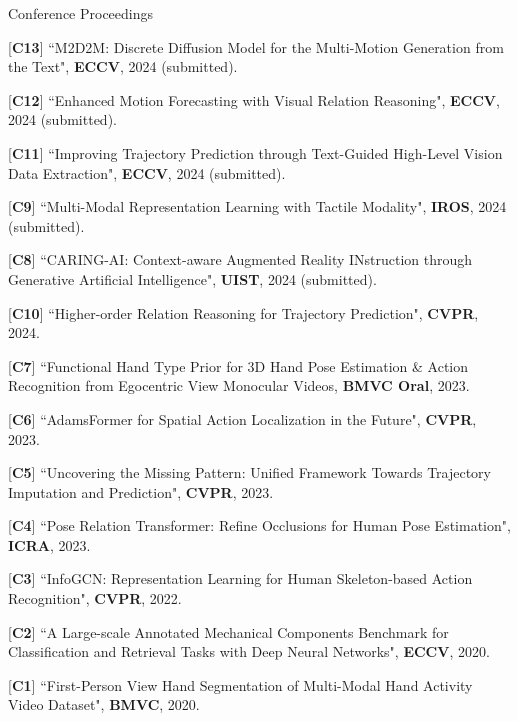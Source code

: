 


\begin{cventries}
\cvpub
{Conference Proceedings} %
{ %
\begin{cvitems}
    \item {[\textbf{C13}] ``M2D2M: Discrete Diffusion Model for the Multi-Motion Generation from the Text", \textbf{ECCV}, 2024 (submitted).}
    \item {[\textbf{C12}] ``Enhanced Motion Forecasting with Visual Relation Reasoning", \textbf{ECCV}, 2024 (submitted).}
    \item {[\textbf{C11}] ``Improving Trajectory Prediction through Text-Guided High-Level Vision Data Extraction", \textbf{ECCV}, 2024 (submitted).}
    \item {[\textbf{C9}] ``Multi-Modal Representation Learning with Tactile Modality", \textbf{IROS}, 2024 (submitted).}
    \item {[\textbf{C8}] ``CARING-AI: Context-aware Augmented Reality INstruction through Generative Artificial Intelligence", \textbf{UIST}, 2024 (submitted).}
    \item {[\textbf{C10}] ``Higher-order Relation Reasoning for Trajectory Prediction", \textbf{CVPR}, 2024.}
    \item {[\textbf{C7}] ``Functional Hand Type Prior for 3D Hand Pose Estimation \& Action Recognition from Egocentric View Monocular Videos, \textbf{BMVC Oral}, 2023.}
    \item {[\textbf{C6}] ``AdamsFormer for Spatial Action Localization in the Future", \textbf{CVPR}, 2023.}
    \item {[\textbf{C5}] ``Uncovering the Missing Pattern: Unified Framework Towards Trajectory Imputation and Prediction", \textbf{CVPR}, 2023.}
    \item {[\textbf{C4}] ``Pose Relation Transformer: Refine Occlusions for Human Pose Estimation", \textbf{ICRA}, 2023.}
    \item {[\textbf{C3}] ``InfoGCN: Representation Learning for Human Skeleton-based Action Recognition", \textbf{CVPR}, 2022.}
    \item {[\textbf{C2}] ``A Large-scale Annotated Mechanical Components Benchmark for Classification and Retrieval Tasks with Deep Neural Networks", \textbf{ECCV}, 2020.}
    \item {[\textbf{C1}] ``First-Person View Hand Segmentation of Multi-Modal Hand Activity Video Dataset", \textbf{BMVC}, 2020.}
\end{cvitems}
}



\end{cventries}
